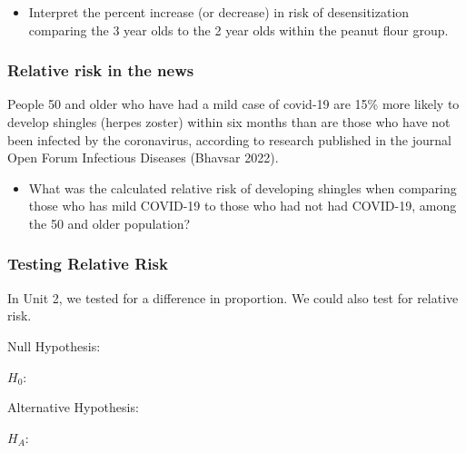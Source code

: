 \documentclass[
]{report}
\providecommand{\tightlist}{%
  \setlength{\itemsep}{0pt}\setlength{\parskip}{0pt}}
\begin{document}
\vspace{0.8in}

\begin{itemize}
\tightlist
\item
  Interpret the percent increase (or decrease) in risk of desensitization comparing the 3 year olds to the 2 year olds within the peanut flour group.
\end{itemize}

\vspace{0.8in}

\subsubsection*{Relative risk in the news}\label{relative-risk-in-the-news}

People 50 and older who have had a mild case of covid-19 are 15\% more likely to develop shingles (herpes zoster) within six months than are those who have not been infected by the coronavirus, according to research published in the journal Open Forum Infectious Diseases (Bhavsar 2022).

\begin{itemize}
\tightlist
\item
  What was the calculated relative risk of developing shingles when comparing those who has mild COVID-19 to those who had not had COVID-19, among the 50 and older population?
\end{itemize}

\vspace{0.8in}

\subsubsection*{Testing Relative Risk}\label{testing-relative-risk}

In Unit 2, we tested for a difference in proportion. We could also test for relative risk.


Null Hypothesis:

\(H_0:\)

\vspace{0.2in}

Alternative Hypothesis:

\(H_A:\)

\vspace{0.2in}
\end{document}
